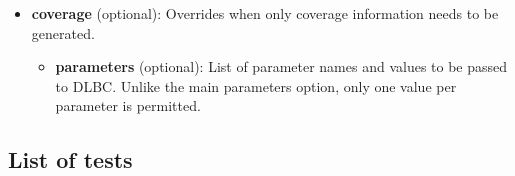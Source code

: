\documentclass{article}
\begin{document}
\begin{itemize}
\begin{itemize}
\end{itemize}
\item \textbf{coverage} (optional): Overrides when only coverage information needs to be generated.
\begin{itemize}
\item \textbf{parameters} (optional): List of parameter names and values to be passed to DLBC. Unlike the main parameters option, only one value per parameter is permitted.
\end{itemize}
\end{itemize}

\subsection{List of tests}


\end{document}
